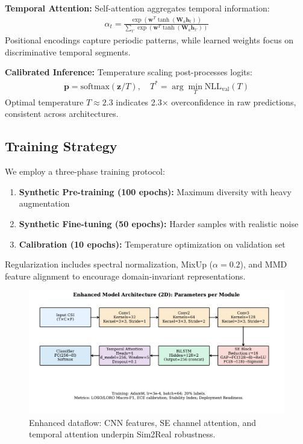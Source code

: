 \documentclass[journal]{IEEEtran}
\begin{document}
\textbf{Temporal Attention:} Self-attention aggregates temporal information:
\begin{align}
\alpha_t = \frac{\exp(\mathbf{w}^T \tanh(\mathbf{W}_a \mathbf{h}_t))}{\sum_{t'} \exp(\mathbf{w}^T \tanh(\mathbf{W}_a \mathbf{h}_{t'}))}
\end{align}
Positional encodings capture periodic patterns, while learned weights focus on discriminative temporal segments.

\textbf{Calibrated Inference:} Temperature scaling post-processes logits:
\begin{align}
\mathbf{p} = \text{softmax}(\mathbf{z}/T), \quad T^* = \arg\min_T \text{NLL}_{\text{val}}(T)
\end{align}
Optimal temperature $T \approx 2.3$ indicates 2.3× overconfidence in raw predictions, consistent across architectures.

\subsection{Training Strategy}
We employ a three-phase training protocol:
\begin{enumerate}
\item \textbf{Synthetic Pre-training (100 epochs):} Maximum diversity with heavy augmentation
\item \textbf{Synthetic Fine-tuning (50 epochs):} Harder samples with realistic noise
\item \textbf{Calibration (10 epochs):} Temperature optimization on validation set
\end{enumerate}

Regularization includes spectral normalization, MixUp ($\alpha=0.2$), and MMD feature alignment to encourage domain-invariant representations.

\begin{figure}[t]
\centering
\includegraphics[width=\columnwidth]{figures/fig3_enhanced_model_dataflow.pdf}
\caption{Enhanced dataflow: CNN features, SE channel attention, and temporal attention underpin Sim2Real robustness.}
\label{fig:enhanced}
\end{figure}
\end{document}
